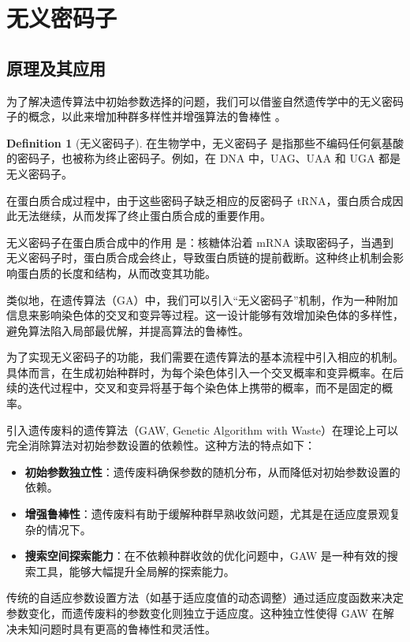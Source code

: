 \documentclass[journal=gmj]{report}%
\theoremstyle{definition}
\newtheorem{definition}[theorem]{Definition}
\numberwithin{equation}{section}
\begin{document}
\section{无义密码子}

\subsection{原理及其应用}

为了解决遗传算法中初始参数选择的问题，我们可以借鉴自然遗传学中的无义密码子的概念，以此来增加种群多样性并增强算法的鲁棒性 \cite{NOVKOVIC1998895}。

\begin{definition}[无义密码子]
    在生物学中，无义密码子 \cite{baikeWuYi} 是指那些不编码任何氨基酸的密码子，也被称为终止密码子。例如，在 DNA 中，UAG、UAA 和 UGA 都是无义密码子。

    在蛋白质合成过程中，由于这些密码子缺乏相应的反密码子 tRNA，蛋白质合成因此无法继续，从而发挥了终止蛋白质合成的重要作用。
\end{definition}

无义密码子在蛋白质合成中的作用 \cite{proteinSynthesis} 是：核糖体沿着 mRNA 读取密码子，当遇到无义密码子时，蛋白质合成会终止，导致蛋白质链的提前截断。这种终止机制会影响蛋白质的长度和结构，从而改变其功能。

类似地，在遗传算法（GA）中，我们可以引入“无义密码子”机制，作为一种附加信息来影响染色体的交叉和变异等过程。这一设计能够有效增加染色体的多样性，避免算法陷入局部最优解，并提高算法的鲁棒性。

为了实现无义密码子的功能，我们需要在遗传算法的基本流程中引入相应的机制。具体而言，在生成初始种群时，为每个染色体引入一个交叉概率和变异概率。在后续的迭代过程中，交叉和变异将基于每个染色体上携带的概率，而不是固定的概率。

引入遗传废料的遗传算法（GAW, Genetic Algorithm with Waste）在理论上可以完全消除算法对初始参数设置的依赖性。这种方法的特点如下：
\begin{itemize}
    \item \textbf{初始参数独立性}：遗传废料确保参数的随机分布，从而降低对初始参数设置的依赖。
    \item \textbf{增强鲁棒性}：遗传废料有助于缓解种群早熟收敛问题，尤其是在适应度景观复杂的情况下。
    \item \textbf{搜索空间探索能力}：在不依赖种群收敛的优化问题中，GAW 是一种有效的搜索工具，能够大幅提升全局解的探索能力。
\end{itemize}

传统的自适应参数设置方法（如基于适应度值的动态调整）通过适应度函数来决定参数变化，而遗传废料的参数变化则独立于适应度。这种独立性使得 GAW 在解决未知问题时具有更高的鲁棒性和灵活性。
\end{document}
